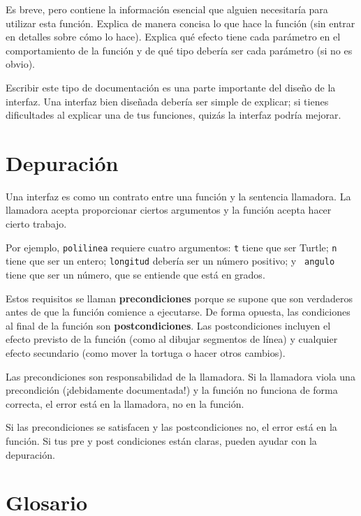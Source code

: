 \documentclass[10pt]{book}
\begin{document}
Es breve, pero contiene la información esencial
que alguien necesitaría para utilizar esta función.  Explica de manera concisa lo que
hace la función (sin entrar en detalles sobre cómo lo
hace).  Explica qué efecto tiene cada parámetro en el comportamiento de
la función y de qué tipo debería ser cada parámetro (si no es
obvio).

Escribir este tipo de documentación es una parte importante del diseño de la
interfaz.  Una interfaz bien diseñada debería ser simple de explicar;
si tienes dificultades al explicar una de tus funciones,
quizás la interfaz podría mejorar.


\section{Depuración}

Una interfaz es como un contrato entre una función y la sentencia llamadora.
La llamadora acepta proporcionar ciertos argumentos y la función
acepta hacer cierto trabajo.

Por ejemplo, {\tt polilinea} requiere cuatro argumentos: {\tt t} tiene que ser
Turtle; {\tt n} tiene que ser un
entero; {\tt longitud} debería ser un número positivo; y {\tt
  angulo} tiene que ser un número, que se entiende que está en grados.

Estos requisitos se llaman {\bf precondiciones} porque
se supone que son verdaderos antes de que la función comience a ejecutarse.
De forma opuesta, las condiciones al final de la función son
{\bf postcondiciones}.  Las postcondiciones incluyen el efecto
previsto de la función (como al dibujar segmentos de línea) y cualquier
efecto secundario (como mover la tortuga o hacer otros cambios).

Las precondiciones son responsabilidad de la llamadora.  Si la llamadora
viola una precondición (¡debidamente documentada!) y la función
no funciona de forma correcta, el error está en la llamadora, no en la función.

Si las precondiciones se satisfacen y las postcondiciones
no, el error está en la función.  Si tus pre y post condiciones
están claras, pueden ayudar con la depuración.


\section{Glosario}
\end{document}

